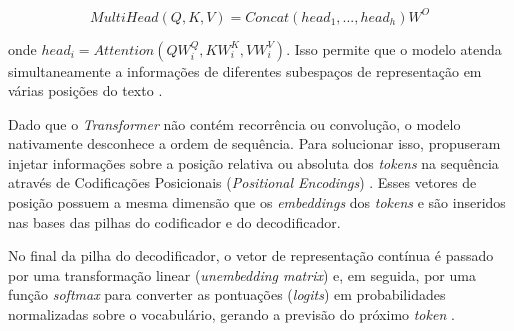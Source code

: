 \documentclass[
    12pt,                %
    openright,           %
    oneside,             %
    a4paper,             %
    english,             %
    brazil               %
]{abntex2}
\begin{document}
\begin{itemize}
\begin{equation}
  MultiHead(Q, K, V) = Concat(head_1, ..., head_h) W^O
\end{equation}

onde $head_i = Attention(QW^{Q}_i, KW^{K}_i,VW^{V}_i)$.
Isso permite que o modelo atenda simultaneamente a informações de diferentes subespaços de representação em várias posições do texto \cite{vaswani2017attention}.
\par
Dado que o \textit{Transformer} não contém recorrência ou convolução, o modelo nativamente desconhece a ordem de sequência.
Para solucionar isso,  propuseram injetar informações sobre a posição relativa ou absoluta dos \textit{tokens} na sequência através de Codificações Posicionais (\textit{Positional Encodings}) \cite{vaswani2017attention}.
Esses vetores de posição possuem a mesma dimensão que os \textit{embeddings} dos \textit{tokens} e são inseridos nas bases das pilhas do codificador e do decodificador.
\par
No final da pilha do decodificador, o vetor de representação contínua é passado por uma transformação linear (\textit{unembedding matrix}) e, em seguida, por uma função \textit{softmax} para converter as pontuações (\textit{logits}) em probabilidades normalizadas sobre o vocabulário, gerando a previsão do próximo \textit{token} \cite{vaswani2017attention}.


\end{itemize}
\end{document}

